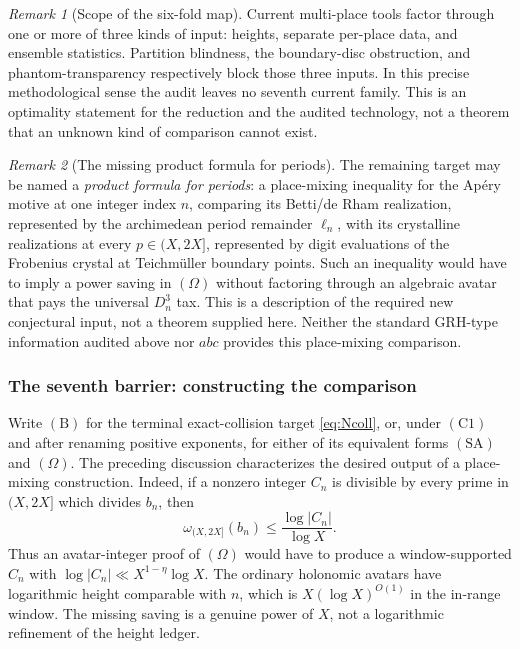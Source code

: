\documentclass[11pt]{amsart}
\theoremstyle{plain}
\theoremstyle{remark}
\newtheorem{remark}{Remark}
\begin{document}
\begin{remark}[Scope of the six-fold map]
Current multi-place tools factor through one or more of three kinds of
input: heights, separate per-place data, and ensemble statistics.
Partition blindness, the boundary-disc obstruction, and
phantom-transparency respectively block those three inputs.  In this
precise methodological sense the audit leaves no seventh current
family.  This is an optimality statement for the reduction and the
audited technology, not a theorem that an unknown kind of comparison
cannot exist.
\end{remark}

\begin{remark}[The missing product formula for periods]
\label{rem:period-product-formula}
The remaining target may be named a \emph{product formula for periods}:
a place-mixing inequality for the Ap\'ery motive at one integer index
$n$, comparing its Betti/de Rham realization, represented by the
archimedean period remainder $\ell_n$, with its crystalline
realizations at every $p\in(X,2X]$, represented by digit evaluations of
the Frobenius crystal at Teichm\"uller boundary points.  Such an
inequality would have to imply a power saving in $(\Omega)$ without
factoring through an algebraic avatar that pays the universal $D_n^3$
tax.  This is a description of the required new conjectural input, not
a theorem supplied here.  Neither the standard GRH-type information
audited above nor $abc$ provides this place-mixing comparison.
\end{remark}

\subsubsection{The seventh barrier: constructing the comparison}

Write $(\mathrm B)$ for the terminal exact-collision target
\eqref{eq:Ncoll}, or, under $(\mathrm C1)$ and after renaming positive
exponents, for either of its equivalent forms $(\mathrm{SA})$ and
$(\Omega)$.  The preceding discussion characterizes the desired
output of a place-mixing construction.  Indeed, if a nonzero integer
$C_n$ is divisible by every prime in $(X,2X]$ which divides $b_n$,
then
\[
 \omega_{(X,2X]}(b_n)\leq\frac{\log|C_n|}{\log X}.
 \tag{8.18}\label{eq:avatar-bound}
\]
Thus an avatar-integer proof of $(\Omega)$ would have to produce a
window-supported $C_n$ with
$\log|C_n|\ll X^{1-\eta}\log X$.  The ordinary holonomic avatars have
logarithmic height comparable with $n$, which is
$X(\log X)^{O(1)}$ in the in-range window.  The missing saving is a
genuine power of $X$, not a logarithmic refinement of the height
ledger.
\end{document}
